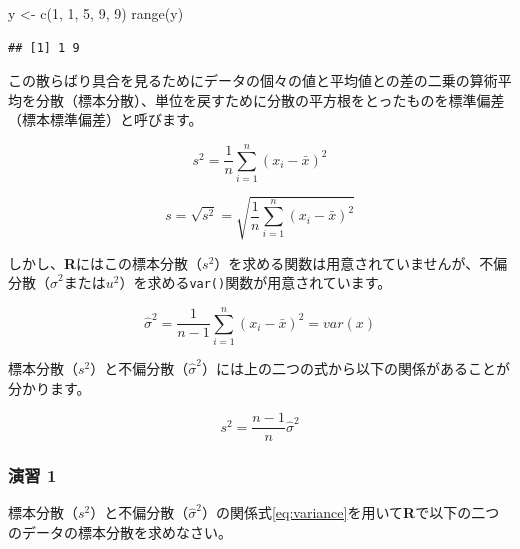 \documentclass[
  12pt,
]{book}
\newenvironment{Shaded}{\begin{snugshade}}{\end{snugshade}}
\newcommand{\DecValTok}[1]{\textcolor[rgb]{0.00,0.00,0.81}{#1}}
\newcommand{\FunctionTok}[1]{\textcolor[rgb]{0.00,0.00,0.00}{#1}}
\newcommand{\NormalTok}[1]{#1}
\newcommand{\OtherTok}[1]{\textcolor[rgb]{0.56,0.35,0.01}{#1}}
\begin{document}
\begin{Shaded}
\begin{Highlighting}[]
\NormalTok{y }\OtherTok{\textless{}{-}} \FunctionTok{c}\NormalTok{(}\DecValTok{1}\NormalTok{, }\DecValTok{1}\NormalTok{, }\DecValTok{5}\NormalTok{, }\DecValTok{9}\NormalTok{, }\DecValTok{9}\NormalTok{)}
\FunctionTok{range}\NormalTok{(y)}
\end{Highlighting}
\end{Shaded}

\begin{verbatim}
## [1] 1 9
\end{verbatim}

この散らばり具合を見るためにデータの個々の値と平均値との差の二乗の算術平均を分散（標本分散）、単位を戻すために分散の平方根をとったものを標準偏差（標本標準偏差）と呼びます。

\begin{equation}
  s^2 = \frac{1}{n} \sum_{i = 1}^n (x_i - \bar{x})^2
\end{equation}

\begin{equation}
  s = \sqrt{s^2} = \sqrt{\frac{1}{n} \sum_{i = 1}^n (x_i - \bar{x})^2}
\end{equation}

しかし、\textbf{R}にはこの標本分散（\(s^2\)）を求める関数は用意されていませんが、不偏分散（\(\hat{\sigma}^2\)または\(u^2\)）を求める\texttt{var()}関数が用意されています。

\begin{equation}
  \hat{\sigma}^2 = \frac{1}{n - 1} \sum_{i = 1}^n (x_i - \bar{x})^2 = var(x)
\end{equation}

標本分散（\(s^2\)）と不偏分散（\(\hat{\sigma}^2\)）には上の二つの式から以下の関係があることが分かります。

\begin{equation}
  s^2 = \frac{n - 1}{n}\hat{\sigma}^2
  \label{eq:variance}
\end{equation}

\hypertarget{ux6f14ux7fd2-1}{%
\subsubsection*{演習 1}\label{ux6f14ux7fd2-1}}

標本分散（\(s^2\)）と不偏分散（\(\hat{\sigma}^2\)）の関係式\eqref{eq:variance}を用いて\textbf{R}で以下の二つのデータの標本分散を求めなさい。
\end{document}
